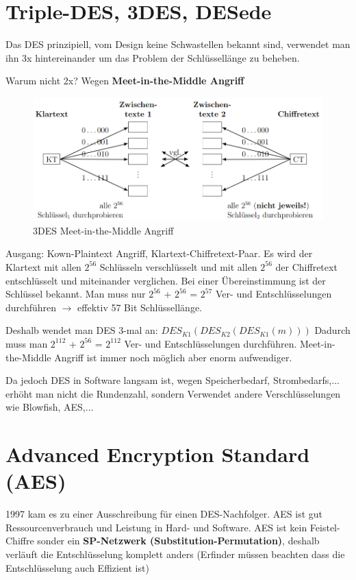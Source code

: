 \section{Triple-DES, 3DES, DESede}
Das DES prinzipiell, vom Design keine Schwastellen bekannt sind, verwendet man ihn 3x hintereinander um das Problem der Schlüssellänge zu beheben.

Warum nicht 2x? Wegen \textbf{Meet-in-the-Middle Angriff}
\begin{figure}[H]
	\centering
	\includegraphics[width=1.0\linewidth]{figures/3des_mitm.png}
	\caption{3DES Meet-in-the-Middle Angriff}
\end{figure}
Ausgang: Kown-Plaintext Angriff, Klartext-Chiffretext-Paar. Es wird der Klartext mit allen $2^{56}$ Schlüsseln verschlüsselt und mit allen $2^{56}$ der Chiffretext entschlüsselt und miteinander verglichen. Bei einer Übereinstimmung ist der Schlüssel bekannt. Man muss nur $2^{56}$ + $2^{56}$ = $2^{57}$ Ver- und Entschlüsselungen durchführen $\rightarrow$ effektiv 57 Bit Schlüssellänge.

Deshalb wendet man DES 3-mal an: $DES_{K1}(DES_{K2}(DES_{K1}(m)))$
Dadurch muss man $2^{112}$ + $2^{56}$ = $2^{112}$ Ver- und Entschlüsselungen durchführen. Meet-in-the-Middle Angriff ist immer noch möglich aber enorm aufwendiger.

Da jedoch DES in Software langsam ist, wegen Speicherbedarf, Strombedarfs,... erhöht man nicht die Rundenzahl, sondern Verwendet andere Verschlüsselungen wie Blowfish, AES,...

\section{Advanced Encryption Standard (AES)}
1997 kam es zu einer Ausschreibung für einen DES-Nachfolger. AES ist gut Ressourcenverbrauch und Leistung in Hard- und Software. AES ist kein Feistel-Chiffre sonder ein \textbf{SP-Netzwerk (Substitution-Permutation)}, deshalb verläuft die Entschlüsselung komplett anders (Erfinder müssen beachten dass die Entschlüsselung auch Effizient ist)

